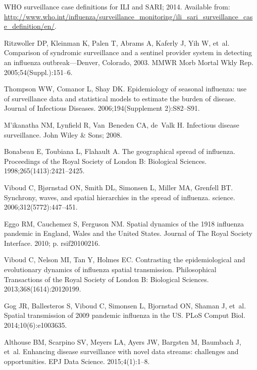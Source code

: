 \documentclass[10pt,letterpaper]{article}
\begin{document}
\begin{thebibliography}{10}
WHO surveillance case definitions for ILI and SARI; 2014.
\newblock Available from:
  \url{http://www.who.int/influenza/surveillance_monitoring/ili_sari_surveillance_case_definition/en/}.

Ritzwoller DP, Kleinman K, Palen T, Abrams A, Kaferly J, Yih W, et~al.
\newblock Comparison of syndromic surveillance and a sentinel provider system
  in detecting an influenza outbreak—Denver, Colorado, 2003.
\newblock MMWR Morb Mortal Wkly Rep. 2005;54(Suppl.):151--6.

Thompson WW, Comanor L, Shay DK.
\newblock Epidemiology of seasonal influenza: use of surveillance data and
  statistical models to estimate the burden of disease.
\newblock Journal of Infectious Diseases. 2006;194(Supplement 2):S82--S91.

M'ikanatha NM, Lynfield R, Van~Beneden CA, de~Valk H.
\newblock Infectious disease surveillance.
\newblock John Wiley \& Sons; 2008.

Bonabeau E, Toubiana L, Flahault A.
\newblock The geographical spread of influenza.
\newblock Proceedings of the Royal Society of London B: Biological Sciences.
  1998;265(1413):2421--2425.

Viboud C, Bj{\o}rnstad ON, Smith DL, Simonsen L, Miller MA, Grenfell BT.
\newblock Synchrony, waves, and spatial hierarchies in the spread of influenza.
\newblock science. 2006;312(5772):447--451.

Eggo RM, Cauchemez S, Ferguson NM.
\newblock Spatial dynamics of the 1918 influenza pandemic in England, Wales and
  the United States.
\newblock Journal of The Royal Society Interface. 2010; p. rsif20100216.

Viboud C, Nelson MI, Tan Y, Holmes EC.
\newblock Contrasting the epidemiological and evolutionary dynamics of
  influenza spatial transmission.
\newblock Philosophical Transactions of the Royal Society of London B:
  Biological Sciences. 2013;368(1614):20120199.

Gog JR, Ballesteros S, Viboud C, Simonsen L, Bjornstad ON, Shaman J, et~al.
\newblock Spatial transmission of 2009 pandemic influenza in the US.
\newblock PLoS Comput Biol. 2014;10(6):e1003635.

Althouse BM, Scarpino SV, Meyers LA, Ayers JW, Bargsten M, Baumbach J, et~al.
\newblock Enhancing disease surveillance with novel data streams: challenges
  and opportunities.
\newblock EPJ Data Science. 2015;4(1):1--8.


\end{thebibliography}
\end{document}
